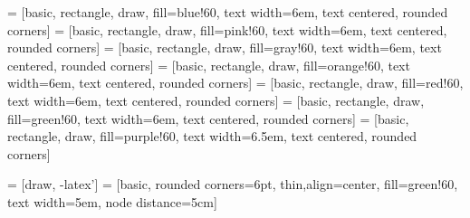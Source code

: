 \documentclass{article}
\begin{document}

 = [basic, rectangle, draw, fill=blue!60, 
    text width=6em, text centered, rounded corners]
 = [basic, rectangle, draw, fill=pink!60, 
    text width=6em, text centered, rounded corners]
 = [basic, rectangle, draw, fill=gray!60, 
    text width=6em, text centered, rounded corners]
 = [basic, rectangle, draw, fill=orange!60, 
    text width=6em, text centered, rounded corners]
 = [basic, rectangle, draw, fill=red!60, 
    text width=6em, text centered, rounded corners]
 = [basic, rectangle, draw, fill=green!60, 
    text width=6em, text centered, rounded corners]
 = [basic, rectangle, draw, fill=purple!60, 
    text width=6.5em, text centered, rounded corners]    

 = [draw, -latex']
 = [basic, rounded corners=6pt, thin,align=center, fill=green!60, text width=5em, node distance=5cm] 
\end{document}
